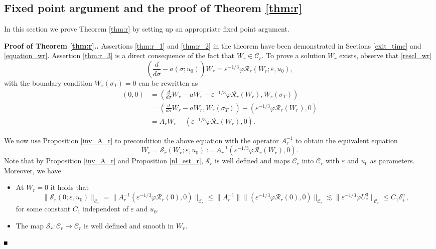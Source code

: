 \documentclass[letterpaper,11pt]{article}
\newcommand{\eps}{\varepsilon}
\newcommand{\lar}{ \lesssim }
\newcommand{\Ral}{\mathcal{R}}
\numberwithin{equation}{section}
\theoremstyle{plain}
\newenvironment{Proof}[1][\unskip]%
 {\begin{trivlist} \item[]{\bf Proof #1. }}%
 {\hspace*{\fill}$\rule{.4\baselineskip}{.4\baselineskip}$\end{trivlist}}
\begin{document}
\subsection{Fixed point argument and the proof of Theorem \ref{thm:r}}
In this section we prove Theorem \ref{thm:r} by setting up an appropriate fixed point argument.
\begin{Proof}[ of Theorem \ref{thm:r}.]
Assertions \ref{thm:r_1} and \ref{thm:r_2} in the theorem have been demonstrated in Sections \ref{exit_time} and \ref{equation_wr}. Assertion \ref{thm:r_3} is a direct consequence of the fact that $W_r \in \mathcal{C}_r$. To prove a solution $W_r$ exists, observe that \eqref{rescl_wr}
\[ 
\left(\frac{d}{d\sigma} - a(\sigma; u_0)\right) W_r =\eps^{-1/3}\varphi \mathcal{R}_r(W_r; \eps,u_0),
\]
with the boundary condition $W_r(\sigma_T)=0$ can be rewritten as 
\begin{align*}
(0,0) &=\left( \frac{d}{d\sigma}W_r-aW_r - \eps^{-1/3}\varphi \Ral_r(W_r), W_r(\sigma_T) \right)\\
&=\left( \frac{d}{d\sigma}W_r-aW_r, W_r(\sigma_T) \right)- \left(\eps^{-1/3}\varphi \Ral_r(W_r), 0 \right)\\
&= A_rW_r - \left(\eps^{-1/3}\varphi \Ral_r(W_r), 0 \right).
\end{align*} 


We now use Proposition \ref{inv_A_r} to precondition the above equation with the operator $A_r^{-1}$ to obtain the equivalent equation
\begin{equation}\label{fix_pt:r}
 W_r = \mathcal{S}_r(W_r;\eps,u_0):= A_r^{-1}(\eps^{-1/3}\varphi \mathcal{R}_r(W_r), 0).
\end{equation}
Note that by Proposition \ref{inv_A_r} and Proposition \ref{nl_est_r}, $\mathcal{S}_r$ is well defined and maps $\mathcal{C}_r$ into $\mathcal{C}_r$ with $\eps$ and $u_0$ as parameters. Moreover, we have 
\begin{itemize}
\item At $W_r=0$ it holds that
\[
\|\mathcal{S}_r(0;\eps,u_0) \|_{\mathcal{C}_r}= \|A_r^{-1}(\eps^{-1/3}\varphi \mathcal{R}_r(0), 0)\|_{\mathcal{C}_r} \le \|A_r^{-1}\|\|(\eps^{-1/3}\varphi \mathcal{R}_r(0), 0)\|_{\mathcal{C}_r} \lar \| \eps^{-1/3}\varphi U_*^3\|_{\mathcal{C}_r} \le C_1\delta_+^\alpha,
\]
for some constant $C_1$ independent of $\eps$ and $u_0$.

\item The map $\mathcal{S}_r:\mathcal{C}_r \to \mathcal{C}_r$ is well defined and smooth in $W_r$.


\end{itemize}
\end{Proof}
\end{document}
